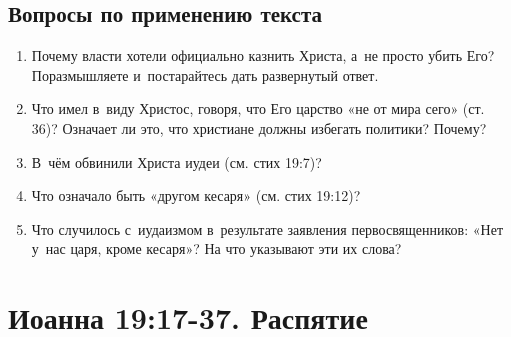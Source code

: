 \documentclass[a4paper,12pt]{article}
\begin{document}
\subsection*{Вопросы по применению текста} 
\begin{enumerate}
    \item Почему власти хотели официально казнить Христа, а~не просто убить Его? Поразмышляете и~постарайтесь дать развернутый ответ. 
    
    \myline
    
    \myline
    \item Что имел в~виду Христос, говоря, что Его царство «не от мира сего» (ст. 36)? Означает ли это, что христиане должны избегать политики? Почему? 
    
    \myline
    
    \myline
    \item В~чём обвинили Христа иудеи (см. стих 19:7)?
    
    \myline
    
    \myline
    \item Что означало быть «другом кесаря» (см. стих 19:12)? 
    
    \myline
    
    \myline
    \item Что случилось с~иудаизмом в~результате заявления первосвященников: «Нет у~нас царя, кроме кесаря»? На что указывают эти их слова? 
    
    \myline
    
    \myline
\end{enumerate}



\section{Иоанна 19:17-37. Распятие}
\end{document}
